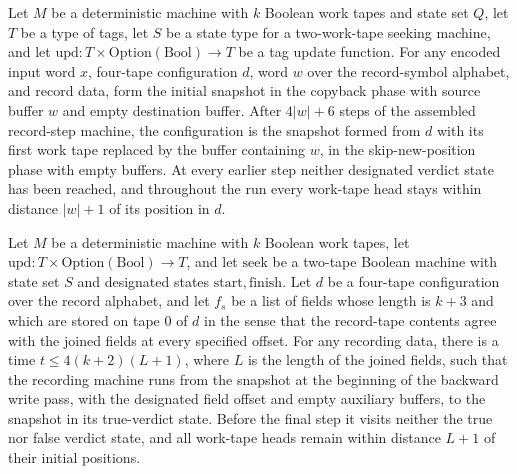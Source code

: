 \begin{theorem}
\label{Turing.recordStep_copyback_run}
\leanok
{}
Let $M$ be a deterministic machine with $k$ Boolean work tapes and state set $Q$, let
$T$ be a type of tags, let $S$ be a state type for a two-work-tape seeking machine, and
let $\mathrm{upd}:T\times\mathrm{Option}(\mathrm{Bool})\to T$ be a tag update function.
For any encoded input word $x$, four-tape configuration $d$, word $w$ over the
record-symbol alphabet, and record data, form the initial snapshot in the copyback phase
with source buffer $w$ and empty destination buffer. After $4|w|+6$ steps of the
assembled record-step machine, the configuration is the snapshot formed from $d$ with
its first work tape replaced by the buffer containing $w$, in the skip-new-position
phase with empty buffers. At every earlier step neither designated verdict state has
been reached, and throughout the run every work-tape head stays within distance $|w|+1$
of its position in $d$.
\end{theorem}

\begin{theorem}
\label{Turing.recordStep_write_back}
\leanok
{}
Let $M$ be a deterministic machine with $k$ Boolean work tapes, let
$\mathrm{upd}:T\times\mathrm{Option}(\mathrm{Bool})\to T$, and let $\mathrm{seek}$ be a
two-tape Boolean machine with state set $S$ and designated states
$\mathrm{start},\mathrm{finish}$. Let $d$ be a four-tape configuration over the record
alphabet, and let $f_s$ be a list of fields whose length is $k+3$ and which are stored
on tape $0$ of $d$ in the sense that the record-tape contents agree with the joined
fields at every specified offset. For any recording data, there is a time $t\le
4(k+2)(L+1)$, where $L$ is the length of the joined fields, such that the recording
machine runs from the snapshot at the beginning of the backward write pass, with the
designated field offset and empty auxiliary buffers, to the snapshot in its true-verdict
state. Before the final step it visits neither the true nor false verdict state, and all
work-tape heads remain within distance $L+1$ of their initial positions.
\end{theorem}

